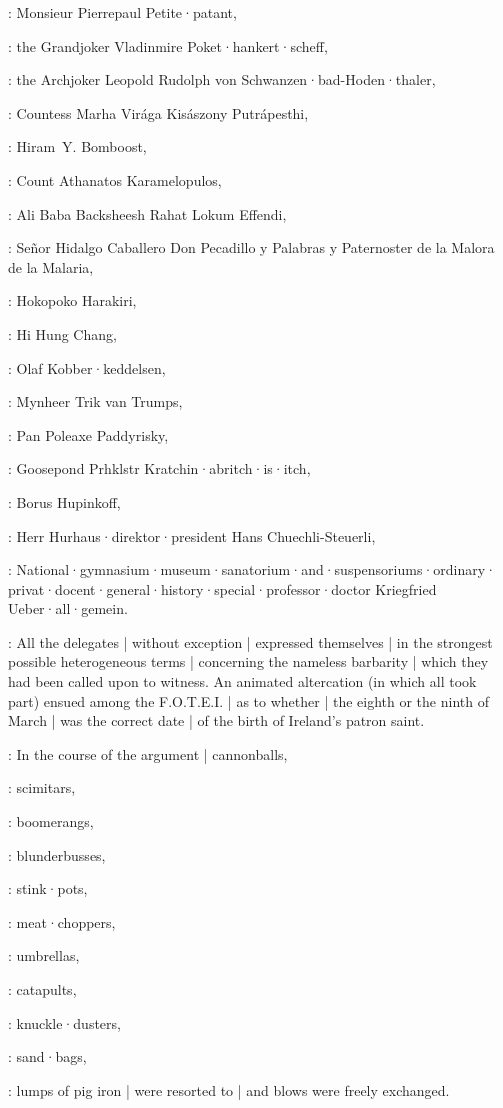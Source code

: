 :
Monsieur Pierrepaul Petite·patant,

:
the Grandjoker Vladinmire Poket·hankert·scheff,

:
the Archjoker Leopold Rudolph von Schwanzen·bad-Hoden·thaler,

:
Countess Marha Virága Kisászony Putrápesthi,

:
Hiram~Y. Bomboost,

:
Count Athanatos Karamelopulos,

:
Ali Baba Backsheesh Rahat Lokum Effendi,

:
Señor Hidalgo Caballero Don Pecadillo y Palabras y Paternoster
de la Malora de la Malaria,

:
Hokopoko Harakiri,

:
Hi Hung Chang,

:
Olaf Kobber·keddelsen,

:
Mynheer Trik van Trumps,

:
Pan Poleaxe Paddyrisky,

:
Goosepond Prhklstr Kratchin·abritch·is·itch,

:
Borus Hupinkoff,

:
Herr Hurhaus·direktor·president Hans Chuechli-Steuerli,

:
National·gymnasium·museum·sanatorium·and·suspensoriums·ordinary·%
privat·docent·general·history·special·professor·doctor
Kriegfried Ueber·all·gemein.

:
All the delegates |
without exception |
expressed themselves |
in the strongest possible heterogeneous terms
 |
concerning the nameless barbarity |
which they had been called upon to witness.
An animated altercation
(in which all took part)
ensued among the F.O.T.E.I. |
as to whether |
the eighth or the ninth of March |
was the correct date |
of the birth of Ireland's patron saint.

:
In the course of the argument |
cannonballs,

:
scimitars,

:
boomerangs,

:
blunderbusses,

:
stink·pots,

:
meat·choppers,

:
umbrellas,

:
catapults,

:
knuckle·dusters,

:
sand·bags,

:
lumps of pig iron |
were resorted to |
and blows were freely exchanged.

